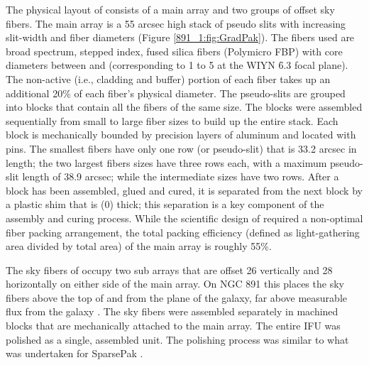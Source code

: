 The physical layout of \GP consists of a main array and two groups of
offset sky fibers. The main array is a 55 arcsec high stack of pseudo
slits with increasing slit-width and fiber diameters (Figure
\ref{891_1:fig:GradPak}). The fibers used are broad spectrum, stepped index,
fused silica fibers (Polymicro FBP) with core diameters between
 and  (corresponding to 1
to 5 at the WIYN \f6.3 focal plane). The non-active
(i.e., cladding and buffer) portion of each fiber takes up an
additional 20\% of each fiber's physical diameter. The pseudo-slits
are grouped into blocks that contain all the fibers of the same
size. The blocks were assembled sequentially from small to large fiber
sizes to build up the entire stack. Each block is mechanically bounded
by precision layers of aluminum and located with pins. The smallest
fibers have only one row (or pseudo-slit) that is 33.2 arcsec in
length; the two largest fibers sizes have three rows each, with a
maximum pseudo-slit length of 38.9 arcsec; while the intermediate
sizes have two rows. After a block has been assembled, glued and
cured, it is separated from the next block by a plastic shim that is
 (0) thick; this separation is a key
component of the assembly and curing process.  While the scientific
design of \GP required a non-optimal fiber packing arrangement, the
total packing efficiency (defined as light-gathering area divided by
total area) of the main array is roughly 55\%.

The sky fibers of \GP occupy two sub arrays that are offset 26
vertically and 28 horizontally on either side of the main
array. On NGC 891 this places the sky fibers  above the
top of \GP and  from the plane of the galaxy, far
above measurable flux from the galaxy \citep{Rand11}. The sky fibers
were assembled separately in machined blocks that are mechanically
attached to the main array. The entire IFU was polished as a single,
assembled unit. The polishing process was similar to what was
undertaken for SparsePak \citep{Bershady04}.

